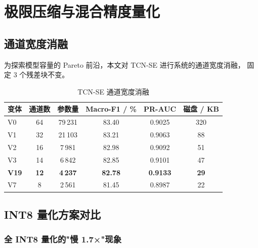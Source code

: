 
\chapter{极限压缩与混合精度量化}
\label{chap:deploy}


\section{通道宽度消融}
\label{sec:deploy_width}

\par 为探索模型容量的 Pareto 前沿，本文对 TCN-SE 进行系统的通道宽度消融，
固定 3 个残差块不变。

\begin{table}[H]
\centering
\caption{TCN-SE 通道宽度消融}
\label{tab:width_ablation}
\small
\begin{tabular}{lccccc}
\toprule
变体 & 通道数 & 参数量 & Macro-F1 / \% & PR-AUC & 磁盘 / KB \\
\midrule
V0 & 64 & 79\,231 & 83.40 & 0.9025 & 320 \\
V1 & 32 & 21\,103 & 83.21 & 0.9063 & 88 \\
V2 & 16 & 7\,981 & 82.98 & 0.9092 & 51 \\
V3 & 14 & 6\,842 & 82.85 & 0.9101 & 47 \\
\textbf{V19} & \textbf{12} & \textbf{4\,237} & \textbf{82.78} & \textbf{0.9133} & \textbf{29} \\
V7 & 8  & 2\,561 & 81.45 & 0.8987 & 22 \\
\bottomrule
\end{tabular}
\end{table}


\section{INT8 量化方案对比}
\label{sec:deploy_int8}

\subsection{全 INT8 量化的"慢 1.7×"现象}
\label{sec:full_int8}

